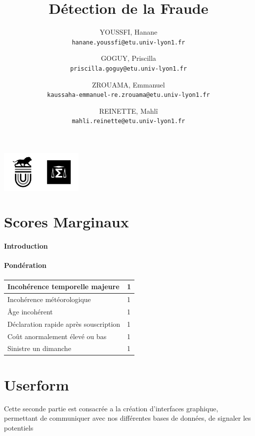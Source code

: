\documentclass[10pt,a4paper]{article}
\title{Détection de la Fraude}
\author{YOUSSFI, Hanane\\ 
		\texttt{hanane.youssfi@etu.univ-lyon1.fr}
  		\and
  		GOGUY, Priscilla\\
  		\texttt{priscilla.goguy@etu.univ-lyon1.fr}
  		\and
  		ZROUAMA, Emmanuel\\
  		\texttt{kaussaha-emmanuel-re.zrouama@etu.univ-lyon1.fr}
  		\and
  		REINETTE, Mahlî\\
  		\texttt{mahli.reinette@etu.univ-lyon1.fr}}
\date{}
\begin{document}
\pagecolor{black!20}
\maketitle


\begin{center}
	\includegraphics[width=4cm,height=2cm]{img9}
\end{center}


\newpage
\tableofcontents

\part{Scores Marginaux}
\subsection{Introduction}

\subsection{Pondération}
\begin{center}
\begin{tabular}{|l|l|} \hline

Incohérence temporelle majeure & 1 \\ \hline

Incohérence météorologique & 1 \\ \hline

Âge incohérent & 1 \\ \hline

Déclaration rapide après souscription & 1 \\ \hline

Coût anormalement élevé ou bas & 1 \\ \hline

Sinistre un dimanche & 1 \\ \hline


\end{tabular}
\end{center}

\part{Userform}
\begin{center}
\begin{minipage}[r]{0.1\textwidth}

\end{minipage}
\begin{minipage}[r]{0.8\textwidth}

Cette seconde partie est consacrée a la création d'interfaces graphique, permettant de communiquer avec nos différentes bases de données, de signaler les potentiels 

\end{minipage}
\end{center}
\end{document}
